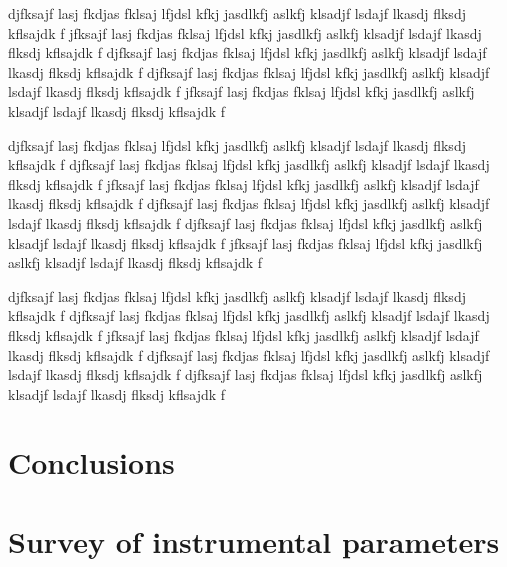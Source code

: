 \documentclass[twocolumn]{../../common/aa}
\begin{document}
djfksajf lasj fkdjas fklsaj lfjdsl kfkj jasdlkfj aslkfj klsadjf lsdajf lkasdj flksdj kflsajdk f
jfksajf lasj fkdjas fklsaj lfjdsl kfkj jasdlkfj aslkfj klsadjf lsdajf lkasdj flksdj kflsajdk f
djfksajf lasj fkdjas fklsaj lfjdsl kfkj jasdlkfj aslkfj klsadjf lsdajf lkasdj flksdj kflsajdk f
djfksajf lasj fkdjas fklsaj lfjdsl kfkj jasdlkfj aslkfj klsadjf lsdajf lkasdj flksdj kflsajdk f
jfksajf lasj fkdjas fklsaj lfjdsl kfkj jasdlkfj aslkfj klsadjf lsdajf lkasdj flksdj kflsajdk f

djfksajf lasj fkdjas fklsaj lfjdsl kfkj jasdlkfj aslkfj klsadjf lsdajf lkasdj flksdj kflsajdk f
djfksajf lasj fkdjas fklsaj lfjdsl kfkj jasdlkfj aslkfj klsadjf lsdajf lkasdj flksdj kflsajdk f
jfksajf lasj fkdjas fklsaj lfjdsl kfkj jasdlkfj aslkfj klsadjf lsdajf lkasdj flksdj kflsajdk f
djfksajf lasj fkdjas fklsaj lfjdsl kfkj jasdlkfj aslkfj klsadjf lsdajf lkasdj flksdj kflsajdk f
djfksajf lasj fkdjas fklsaj lfjdsl kfkj jasdlkfj aslkfj klsadjf lsdajf lkasdj flksdj kflsajdk f
jfksajf lasj fkdjas fklsaj lfjdsl kfkj jasdlkfj aslkfj klsadjf lsdajf lkasdj flksdj kflsajdk f

djfksajf lasj fkdjas fklsaj lfjdsl kfkj jasdlkfj aslkfj klsadjf lsdajf lkasdj flksdj kflsajdk f
djfksajf lasj fkdjas fklsaj lfjdsl kfkj jasdlkfj aslkfj klsadjf lsdajf lkasdj flksdj kflsajdk f
jfksajf lasj fkdjas fklsaj lfjdsl kfkj jasdlkfj aslkfj klsadjf lsdajf lkasdj flksdj kflsajdk f
djfksajf lasj fkdjas fklsaj lfjdsl kfkj jasdlkfj aslkfj klsadjf lsdajf lkasdj flksdj kflsajdk f
djfksajf lasj fkdjas fklsaj lfjdsl kfkj jasdlkfj aslkfj klsadjf lsdajf lkasdj flksdj kflsajdk f


\section{Conclusions}
\label{sec:conclusions}









%






\appendix

\section{Survey of instrumental parameters}
\end{document}

